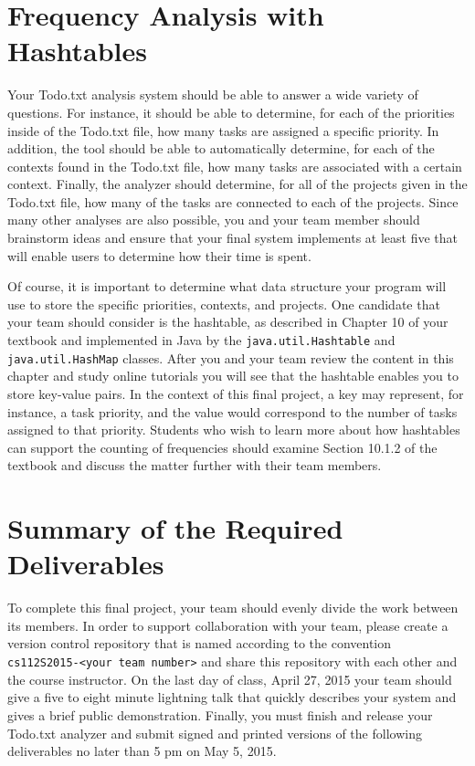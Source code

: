\section*{Frequency Analysis with Hashtables}

  Your Todo.txt analysis system should be able to answer a wide variety of questions. For instance, it should be able to
  determine, for each of the priorities inside of the Todo.txt file, how many tasks are assigned a specific priority.
  In addition, the tool should be able to automatically determine, for each of the contexts found in the Todo.txt file,
  how many tasks are associated with a certain context. Finally, the analyzer should determine, for all of the projects
  given in the Todo.txt file, how many of the tasks are connected to each of the projects. Since many other analyses are
  also possible, you and your team member should brainstorm ideas and ensure that your final system implements at least
  five that will enable users to determine how their time is spent.

  Of course, it is important to determine what data structure your program will use to store the specific priorities,
  contexts, and projects.  One candidate that your team should consider is the hashtable, as described in Chapter 10 of
  your textbook and implemented in Java by the {\tt java.util.Hashtable} and {\tt java.util.HashMap} classes. After you
  and your team review the content in this chapter and study online tutorials you will see that the hashtable enables
  you to store key-value pairs.  In the context of this final project, a key may represent, for instance, a task
  priority, and the value would correspond to the number of tasks assigned to that priority. Students who wish to
  learn more about how hashtables can support the counting of frequencies should examine Section 10.1.2 of the textbook
  and discuss the matter further with their team members.


\section*{Summary of the Required Deliverables}

 To complete this final project, your team should evenly divide the work between its members.  In order to support
 collaboration with your team, please create a version control repository that is named according to the convention {\tt
 cs112S2015-<your team number>} and share this repository with each other and the course instructor. On the last day of
 class, April 27, 2015 your team should give a five to eight minute lightning talk that quickly describes your system
 and gives a brief public demonstration.  Finally, you must finish and release your Todo.txt analyzer and submit signed
 and printed versions of the following deliverables no later than 5 pm on May 5, 2015.

